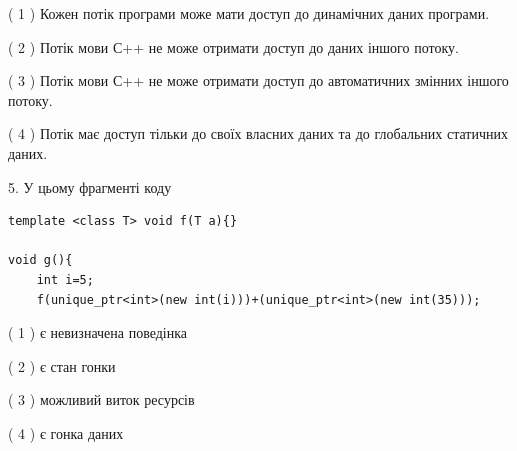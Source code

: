 \documentclass[12pt, ukrainian]{article}
\begin{document}
\begin {large}
{( 1 ) Кожен потік програми може мати доступ до динамічних даних програми.%

( 2 ) Потік мови С++ не може отримати доступ до даних іншого потоку.%

( 3 ) Потік мови С++ не може отримати доступ до автоматичних змінних іншого потоку.%

( 4 ) Потік має доступ тільки до своїх власних даних та до глобальних статичних даних.%


5. У цьому фрагменті коду
\begin{verbatim}
template <class T> void f(T a){}

void g(){
    int i=5;
    f(unique_ptr<int>(new int(i)))+(unique_ptr<int>(new int(35)));
\end{verbatim}
( 1 ) є невизначена поведінка%

( 2 ) є стан гонки%

( 3 ) можливий виток ресурсів%

( 4 ) є гонка даних%
}
\end {large}
\end{document}
